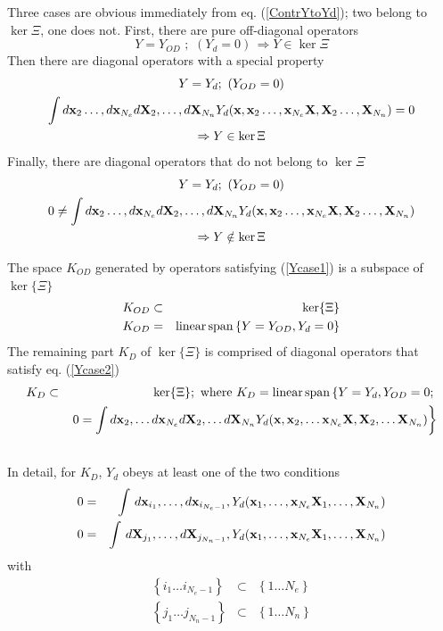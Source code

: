 Three cases are obvious immediately from eq. (\ref{ContrYtoYd}); two belong
to $\ker \Xi $, one does not. First, there are pure off-diagonal operators 
\begin{equation}
Y=Y_{OD}\,\,;\,\,(Y_{d}=0)\,\Rightarrow Y\in \ker \Xi  \label{Ycase1}
\end{equation}%
Then there are diagonal operators with a special property 
\begin{gather}
Y=Y_{d};\,\,(Y_{OD}=0)  \nonumber \\
\int d{\bf x}_{2}\ldots ,d{\bf x}_{N_{e}}d{\bf X}_{2},\ldots ,d{\bf X}%
_{N_{n}}Y_{d}({\bf x},{\bf x}_{2}\ldots ,{\bf x}_{N_{e}}{\bf X},{\bf X}%
_{2}\ldots ,{\bf X}_{N_{n}})=0  \nonumber \\
\Rightarrow Y\in \ker \Xi  \label{Ycase2}
\end{gather}%
Finally, there are diagonal operators that do not belong to $\ker \Xi $ 
\begin{gather}
Y=Y_{d};\,\,(Y_{OD}=0)  \nonumber \\
0\neq \int d{\bf x}_{2}\ldots ,d{\bf x}_{N_{e}}d{\bf X}_{2},\ldots ,d{\bf X}%
_{N_{n}}Y_{d}({\bf x},{\bf x}_{2}\ldots ,{\bf x}_{N_{e}}{\bf X},{\bf X}%
_{2}\ldots ,{\bf X}_{N_{n}})  \nonumber \\
\Rightarrow Y\notin \ker \Xi  \label{Ycase3}
\end{gather}

The space $K_{OD}$ generated by operators satisfying (\ref{Ycase1}) is a
subspace of $\ker \{\Xi \}$ 
\begin{eqnarray}
K_{OD} &\subset &\ker \{\Xi \}  \nonumber \\
K_{OD} &=&{\rm linear\,span}\left\{ Y=Y_{OD},Y_{d}=0\right\}  \label{koddefn}
\end{eqnarray}%
The remaining part $K_{D}$ of $\ker \{\Xi \}$ is comprised of diagonal
operators that satisfy eq. (\ref{Ycase2}) 
\begin{eqnarray}
K_{D} &\subset &\ker \{\Xi \};\text{ where }K_{D}={\rm linear\,span}\left\{
Y=Y_{d},Y_{OD}=0;\right.  \nonumber \\
&&\left. 0=\int d{\bf x}_{2},\ldots d{\bf x}_{N_{e}}d{\bf X}_{2},\ldots d%
{\bf X}_{N_{n}}Y_{d}({\bf x},{\bf x}_{2},\ldots {\bf x}_{N_{e}}{\bf X},{\bf X%
}_{2},\ldots {\bf X}_{N_{n}})\right\}  \nonumber \\
&&  \label{kddefn}
\end{eqnarray}%
In detail, for $K_{D}$, $Y_{d}$ obeys at least one of the two conditions 
\begin{eqnarray}
0 &=&\int \,d{\bf x}_{i_{1}},\ldots ,d{\bf x}_{i_{N_{e}-1}},Y_{d}({\bf x}%
_{1},\ldots ,{\bf x}_{N_{e}}{\bf X}_{1},\ldots ,{\bf X}_{N_{n}})  \nonumber
\\
0 &=&\int \,d{\bf X}_{j_{1}},\ldots ,d{\bf X}_{j_{N_{n}-1}},Y_{d}({\bf x}%
_{1},\ldots ,{\bf x}_{N_{e}}{\bf X}_{1},\ldots ,{\bf X}_{N_{n}})
\label{kddefn1}
\end{eqnarray}%
with 
\begin{eqnarray}
\left\{ i_{1}\ldots i_{N_{e}-1}\right\} &\subset &\left\{ 1\ldots
N_{e}\right\}  \nonumber \\
\left\{ j_{1}\ldots j_{N_{n}-1}\right\} &\subset &\left\{ 1\ldots
N_{n}\right\}  \label{indices}
\end{eqnarray}

